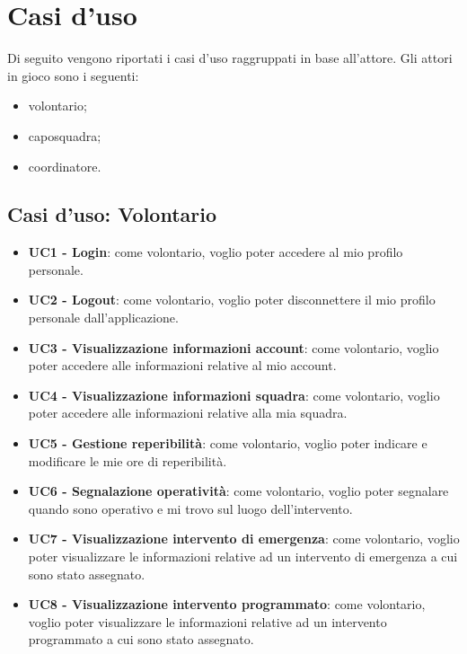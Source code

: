 \section{Casi d'uso}
Di seguito vengono riportati i casi d'uso raggruppati in base all'attore. Gli attori in gioco sono i seguenti:
\begin{itemize}
	\item volontario;
	\item caposquadra;
	\item coordinatore.
\end{itemize}

\subsection{Casi d'uso: Volontario}
\begin{itemize}
	\item \textbf{UC1 - Login}:
	come volontario, voglio poter accedere al mio profilo personale.
	
	\item \textbf{UC2 - Logout}:
	come volontario, voglio poter disconnettere il mio profilo personale dall'applicazione.
	
	\item \textbf{UC3 - Visualizzazione informazioni account}:
	come volontario, voglio poter accedere alle informazioni relative al mio account.
	
	\item \textbf{UC4 - Visualizzazione informazioni squadra}:
	come volontario, voglio poter accedere alle informazioni relative alla mia squadra.
	
	\item \textbf{UC5 - Gestione reperibilità}:
	come volontario, voglio poter indicare e modificare le mie ore di reperibilità.
	
	\item \textbf{UC6 - Segnalazione operatività}:
	come volontario, voglio poter segnalare quando sono operativo e mi trovo sul luogo dell'intervento.
	
	\item \textbf{UC7 - Visualizzazione intervento di emergenza}:
	come volontario, voglio poter visualizzare le informazioni relative ad un intervento di emergenza a cui sono stato assegnato.
	
	\item \textbf{UC8 - Visualizzazione intervento programmato}:
	come volontario, voglio poter visualizzare le informazioni relative ad un intervento programmato a cui sono stato assegnato.
	

\end{itemize}
